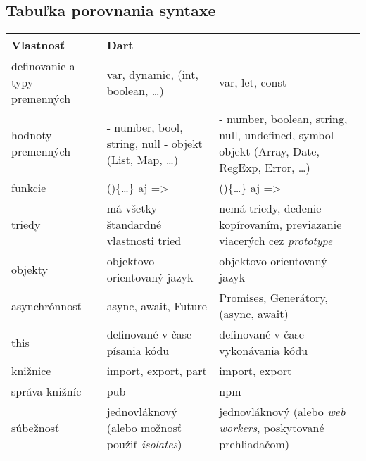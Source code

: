 \subsection{Tabuľka porovnania syntaxe}

\begin{tabular}{| p{4cm} | p{5cm} | p{5cm} |}
 \hline         %
   Vlastnosť & Dart & \JS{} \\ %
  \hline
  \hline
   definovanie a typy premenných & 
   var, dynamic,  (int, boolean, \ldots)& %
   var, let, const \\
   \hline
   hodnoty premenných & 
   - number, bool, string, null \newline
   - objekt (List, Map, \ldots)
    & 
   - number, boolean, string, null, undefined, symbol \newline
   - objekt (Array, Date, RegExp, Error, \ldots)
    \\
   \hline
   funkcie & 
   ()\{\ldots\} aj => & 
   ()\{\ldots\} aj => \\
   \hline
   triedy & 
   má všetky štandardné vlastnosti tried & 
   nemá triedy, dedenie kopírovaním, previazanie viacerých cez \emph{prototype} \\
   \hline
   objekty & 
   objektovo orientovaný jazyk & 
   objektovo orientovaný jazyk \\
   \hline
   asynchrónnosť &
   async, await, Future & 
   Promises, Generátory, (async, await) \\
   \hline
   this & 
   definované v čase písania kódu & 
   definované v čase vykonávania kódu \\
   \hline
   knižnice & 
   import, export, part & 
   import, export \\
   \hline
   správa knižníc & 
   pub & 
   npm \\
   \hline
   súbežnosť & 
   jednovláknový (alebo možnosť použiť \emph{isolates}) & 
   jednovláknový (alebo \emph{web workers}, poskytované prehliadačom) \\
  \hline        %
 \end{tabular}
